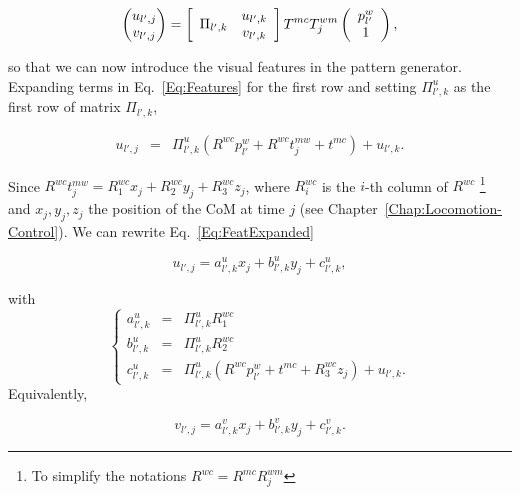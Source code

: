\begin{equation}
\label{Eq:Features}
 \left(
 \begin{matrix}
  u_{l',j} \\
  v_{l',j}
 \end{matrix}
 \right) = 
\left[
\begin{array}{cc}
\multirow{2}{*}{$\Pi_{l',k}$} & u_{l',k} \\
& v_{l',k} \\
\end{array}
\right]
 T^{mc} T^{wm}_j \left( \begin{array}{c}
 p^{w}_{l'}\\
 1
 \end{array}\right),
\end{equation}

so that we can now introduce the visual features in the pattern generator. Expanding terms in Eq.~\ref{Eq:Features} for the first row and setting $\Pi^u_{l',k}$ as the first row of matrix $\Pi_{l',k}$,

\begin{eqnarray}
\label{Eq:FeatExpanded}
 u_{l',j} &= &\Pi^u_{l',k} (R^{wc} p^{w}_{l'} + R^{wc} t^{mw}_j + t^{mc}) + u_{l',k}.
\end{eqnarray}

Since $R^{wc} t^{mw}_j = R^{wc}_1 x_j + R^{wc}_2 y_j + R^{wc}_3 z_j$, where $R^{wc}_i$ is the $i$-th column of $R^{wc}$
\footnote{To simplify the notations $R^{wc}=R^{mc}R_j^{wm}$}
and $x_j,y_j,z_j$ the position of the CoM at time $j$ (see Chapter~\ref{Chap:Locomotion-Control}). We can rewrite Eq.~\ref{Eq:FeatExpanded}

\begin{equation}
\label{Eq:FeaturesUReduced}
 u_{l',j} = a^u_{l',k} x_j + b^u_{l',k} y_j + c^u_{l',k},
\end{equation}

with 
$$
\left\{
\begin{array}{ccl}
a^u_{l',k} & = & \Pi^u_{l',k} R^{wc}_1\\
b^u_{l',k} & = & \Pi^u_{l',k} R^{wc}_2\\
c^u_{l',k} & = & \Pi^u_{l',k} (R^{wc} p^{w}_{l'} + t^{mc} + R^{wc}_3 z_j) + u_{l',k}.
\end{array}
\right.
$$
Equivalently,

\begin{equation}
\label{Eq:FeaturesVReduced}
  v_{l',j} = a^v_{l',k} x_j + b^v_{l',k} y_j + c^v_{l',k}.
\end{equation}

